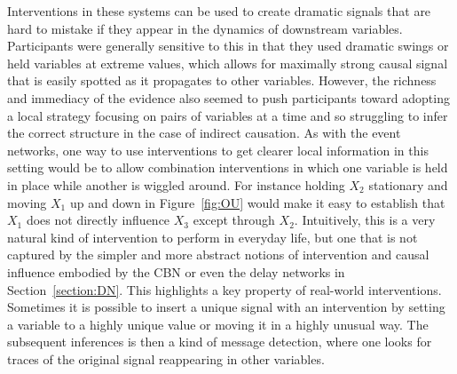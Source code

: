 \documentclass{cambridge7A}%
\newcommand{\ttodo}[2][]{\vspace{0.1cm} \hfil \todo[caption={\textbf{TG}}, size=\footnotesize, color = orange, inline, #1]{#2}}
\def\citeapos#1{\citeauthor{#1}'s (\citeyear{#1})}
\begin{document}
Interventions in these systems can be used to create dramatic signals that are hard to mistake if they appear in the dynamics of downstream variables.  Participants were generally sensitive to this in that they used dramatic swings or held variables at extreme values, which allows for maximally strong causal signal that is easily spotted as it propagates to other variables.  However, the richness and immediacy of the evidence also seemed to push participants toward adopting a local strategy focusing on pairs of variables at a time and so struggling to infer the correct structure in the case of indirect causation.  As with the event networks, one way to use interventions to get clearer local information in this setting would be to allow combination interventions in which one variable is held in place while another is wiggled around.  For instance holding $X_2$ stationary and moving $X_1$ up and down in Figure~\ref{fig:OU} would make it easy to establish that $X_1$ does not directly influence $X_3$ except through $X_2$.  Intuitively, this is a very natural kind of intervention to perform in everyday life, but one that is not captured by the simpler and more abstract notions of intervention and causal influence embodied by the CBN or even the delay networks in Section~\ref{section:DN}.  %
This highlights a key property of real-world interventions.  Sometimes it is possible to insert a unique signal with an intervention by setting a variable to a highly unique value or moving it in a highly unusual way.  The subsequent inferences is then a kind of message detection, where one looks for traces of the original signal reappearing in other variables.
\end{document}
